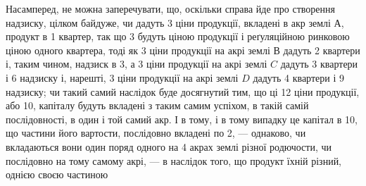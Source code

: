 Насамперед, не можна заперечувати, що, оскільки справа йде про створення
надзиску, цілком байдуже, чи дадуть 3 ціни продукції, вкладені в акр
землі $А$, продукт в 1 квартер, так що 3 будуть ціною продукції і реґуляційною
ринковою ціною одного квартера, тоді як 3 ціни продукції на акрі землі
$В$ дадуть 2 квартери і, таким чином, надзиск в 3, а 3 ціни продукції
на акрі землі $C$ дадуть 3 квартери і 6 надзиску і, нарешті, 3 ціни
продукції на акрі землі $D$ дадуть 4 квартери і 9 надзиску; чи такий самий
наслідок буде досягнутий тим, що ці 12 ціни продукції, або 10,
капіталу будуть вкладені з таким самим успіхом, в такій самій послідовності,
в один і той самий акр. І в тому, і в тому випадку це капітал в 10,
що частини його вартости, послідовно вкладені по 2, — однаково, чи вкладаються
вони один поряд одного на 4 акрах землі різної родючости, чи послідовно на
тому самому акрі, — в наслідок того, що продукт їхній різний, однією своєю частиною
\parbreak{}  %
